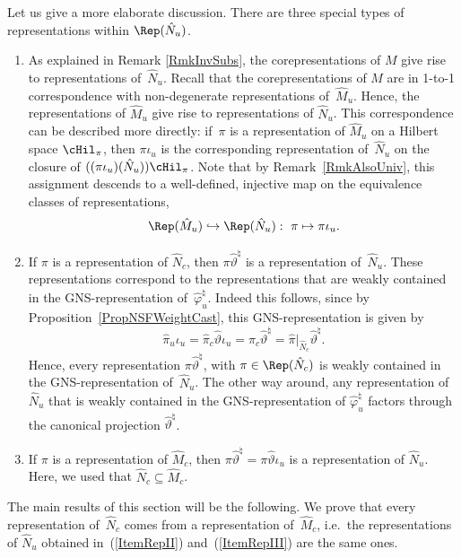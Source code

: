 Let us give a more elaborate discussion. There are three special types of representations within $\Rep(\hat{N}_u)$.
\begin{enumerate}\itemsep=0pt
\item\label{ItemRepI} As explained in Remark \ref{RmkInvSubs}, the corepresentations of $M$ give rise to representations of~$\hat{N}_u$. Recall \cite{Kus} that the corepresentations of $M$ are in 1-to-1 correspondence with non-degenerate representations of~$\hat{M}_u$. Hence, the representations of $\hat{M}_u$ give rise to representations of $\hat{N}_u$. This correspondence can be described more directly: if~$\pi$ is a representation of $\hat{M}_u$ on a Hilbert space $\cHil_\pi$, then $\pi\iota_u$ is the corresponding representation of~$\hat{N}_u$ on the closure of $((\pi\iota_u)(\hat{N}_u)) \cHil_\pi$.  Note that by Remark~\ref{RmkAlsoUniv}, this assignment  descends to a well-def\/ined, injective map on the equivalence classes of representations,
\[
\Rep(\hat{M}_u) \hookrightarrow \Rep(\hat{N}_u): \ \pi \mapsto \pi \iota_u.
\]
\item\label{ItemRepII} If $\pi$ is a representation of $\hat{N}_c$, then $\pi \hat{\vartheta}^\natural$ is a representation of~$\hat{N}_u$. These representations correspond to the representations that are weakly contained in the GNS-representation of~$\hat{\varphi}^\natural_u$. Indeed this follows, since by Proposition~\ref{PropNSFWeightCast}, this GNS-representation is given by
\[
\hat{\pi}_u \iota_u = \hat{\pi}_c \hat{\vartheta} \iota_u = \hat{\pi}_c \hat{\vartheta}^\natural = \hat{\pi}\vert_{\hat{N}_c} \hat{\vartheta}^\natural.
\]
Hence, every representation   $\pi \hat{\vartheta}^\natural$, with $\pi \in \Rep(\hat{N}_c)$ is weakly contained in the GNS-representation of~$\hat{N}_u$. The other way around, any representation of $\hat{N}_u$ that is weakly contained in the GNS-representation of $\hat{\varphi}^\natural_u$ factors through the canonical projection $\hat{\vartheta}^\natural$.
\item\label{ItemRepIII} If $\pi$ is a representation of $\hat{M}_c$, then $\pi \hat{\vartheta}^\natural = \pi \hat{\vartheta} \iota_u$ is a representation of $\hat{N}_u$.  Here, we  used that $\hat{N}_c \subseteq \hat{M}_c$.
\end{enumerate}

The main results of this section will be the following. We prove that every representation of~$\hat{N}_c$ comes from a representation of~$\hat{M}_c$, i.e.\ the representations of $\hat{N}_u$ obtained in~(\ref{ItemRepII}) and~(\ref{ItemRepIII}) are the same ones.

